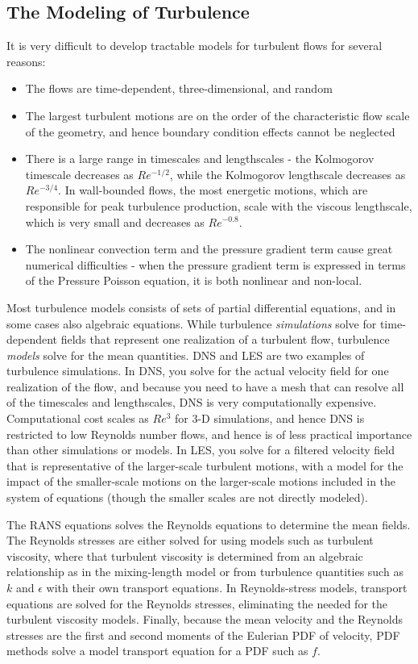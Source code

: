 \documentclass[10pt]{article}
\begin{document}
\begin{flushleft}
\section{The Modeling of Turbulence}

It is very difficult to develop tractable models for turbulent flows for several reasons:

\begin{itemize}
\item The flows are time-dependent, three-dimensional, and random
\item The largest turbulent motions are on the order of the characteristic flow scale of the geometry, and hence boundary condition effects cannot be neglected
\item There is a large range in timescales and lengthscales - the Kolmogorov timescale decreases as \(Re^{-1/2}\), while the Kolmogorov lengthscale decreases as \(Re^{-3/4}\). In wall-bounded flows, the most energetic motions, which are responsible for peak turbulence production, scale with the viscous lengthscale, which is very small and decreases as \(Re^{-0.8}\). 
\item The nonlinear convection term and the pressure gradient term cause great numerical difficulties - when the pressure gradient term is expressed in terms of the Pressure Poisson equation, it is both nonlinear and non-local. 
\end{itemize}

Most turbulence models consists of sets of partial differential equations, and in some cases also algebraic equations. While turbulence \textit{simulations} solve for time-dependent fields that represent one realization of a turbulent flow, turbulence \textit{models} solve for the mean quantities. DNS and LES are two examples of turbulence simulations. In DNS, you solve for the actual velocity field for one realization of the flow, and because you need to have a mesh that can resolve all of the timescales and lengthscales, DNS is very computationally expensive. Computational cost scales as \(Re^3\) for 3-D simulations, and hence DNS is restricted to low Reynolds number flows, and hence is of less practical importance than other simulations or models. In LES, you solve for a filtered velocity field that is representative of the larger-scale turbulent motions, with a model for the impact of the smaller-scale motions on the larger-scale motions included in the system of equations (though the smaller scales are not directly modeled). 

The RANS equations solves the Reynolds equations to determine the mean fields. The Reynolds stresses are either solved for using models such as turbulent viscosity, where that turbulent viscosity is determined from an algebraic relationship as in the mixing-length model or from turbulence quantities such as \(k\) and \(\epsilon\) with their own transport equations. In Reynolds-stress models, transport equations are solved for the Reynolds stresses, eliminating the needed for the turbulent viscosity models. Finally, because the mean velocity and the Reynolds stresses are the first and second moments of the Eulerian PDF of velocity, PDF methods solve a model transport equation for a PDF such as \(f\). 


\end{flushleft}
\end{document}
